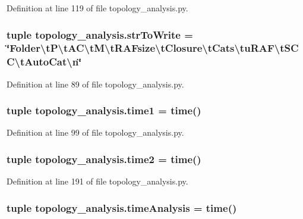Definition at line 119 of file topology\-\_\-analysis.\-py.

\hypertarget{a00128_acecbaeef1428691283d6df79d6b1e689}{
\subsubsection[{str\-To\-Write}]{\setlength{\rightskip}{0pt plus 5cm}tuple topology\-\_\-analysis.\-str\-To\-Write = \char`\"{}Folder\textbackslash{}t\-P\textbackslash{}t\-A\-C\textbackslash{}t\-M\textbackslash{}t\-R\-A\-Fsize\textbackslash{}t\-Closure\textbackslash{}t\-Cats\textbackslash{}tu\-R\-A\-F\textbackslash{}t\-S\-C\-C\textbackslash{}t\-Auto\-Cat\textbackslash{}n\char`\"{}}}\label{a00128_acecbaeef1428691283d6df79d6b1e689}


Definition at line 89 of file topology\-\_\-analysis.\-py.

\hypertarget{a00128_ac7160059dec8067db4645fa39feec359}{
\subsubsection[{time1}]{\setlength{\rightskip}{0pt plus 5cm}tuple topology\-\_\-analysis.\-time1 = time()}}\label{a00128_ac7160059dec8067db4645fa39feec359}


Definition at line 99 of file topology\-\_\-analysis.\-py.

\hypertarget{a00128_a44666efa43bfc08ab8305c8d325f7456}{
\subsubsection[{time2}]{\setlength{\rightskip}{0pt plus 5cm}tuple topology\-\_\-analysis.\-time2 = time()}}\label{a00128_a44666efa43bfc08ab8305c8d325f7456}


Definition at line 191 of file topology\-\_\-analysis.\-py.

\hypertarget{a00128_ace5bda70ff24e6a220afb4438240003a}{
\subsubsection[{time\-Analysis}]{\setlength{\rightskip}{0pt plus 5cm}tuple topology\-\_\-analysis.\-time\-Analysis = time()}}\label{a00128_ace5bda70ff24e6a220afb4438240003a}



